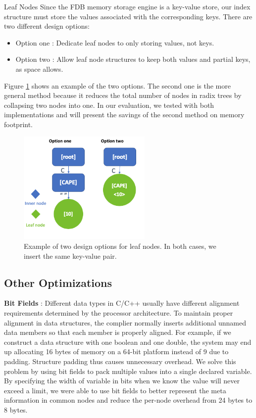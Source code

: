 \documentclass[sigplan,screen,nonacm]{acmart}
\makeatletter
\def\subsubsection{\@startsection{subsubsection}{3}%
  \z@{.5\linespacing\@plus.7\linespacing}{.1\linespacing}%
  {\normalfont\itshape}}
\makeatother
\begin{document}
\subsubsection{Leaf Nodes}
Since the FDB memory storage engine is a key-value store, our index structure must store the values associated with the corresponding keys. There are two different design options: 
\begin{itemize}
    \item Option one : Dedicate leaf nodes to only storing values, not keys.
    \item Option two : Allow leaf node structures to keep both values and partial keys, as space allows.
\end{itemize}
Figure \ref{fig:leaf-nodes} shows an example of the two options. The second one is the more general method because it reduces the total number of nodes in radix trees by collapsing two nodes into one. In our evaluation, we tested with both implementations and will present the savings of the second method on memory footprint. 
\begin{figure}[h]
  \centering
  \includegraphics[width=\linewidth, height=5.5cm]{pic/leaf nodes.png}
  \setlength{\belowcaptionskip}{-10pt} 
  \caption{Example of two design options for leaf nodes. In both cases, we insert the same key-value pair.}
  \label{fig:leaf-nodes}
\end{figure}

\subsection{Other Optimizations}
\textbf {Bit Fields} : Different data types in C/C++ usually have different alignment requirements determined by the processor architecture. To maintain proper alignment in data structures, the complier normally inserts additional unnamed data members so that each member is properly aligned. For example, if we construct a data structure with one boolean and one double, the system may end up allocating 16 bytes of memory on a 64-bit platform instead of 9 due to padding. Structure padding thus causes unnecessary overhead.  We solve this problem by using bit fields to pack multiple values into a single declared variable. By specifying the width of variable in bits when we know the value will never exceed a limit, we were able to use bit fields to better represent the meta information in common nodes and reduce the per-node overhead from 24 bytes to 8 bytes.
\end{document}
